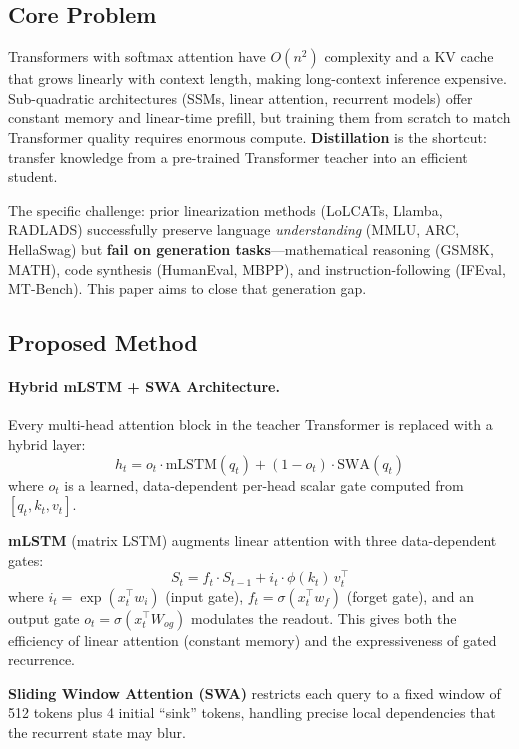 \documentclass[11pt]{article}
\begin{document}
\subsection{Core Problem}

Transformers with softmax attention have $O(n^2)$ complexity and a KV cache that grows linearly with context length, making long-context inference expensive.
Sub-quadratic architectures (SSMs, linear attention, recurrent models) offer constant memory and linear-time prefill, but training them from scratch to match Transformer quality requires enormous compute.
\textbf{Distillation} is the shortcut: transfer knowledge from a pre-trained Transformer teacher into an efficient student.

The specific challenge: prior linearization methods (LoLCATs, Llamba, RADLADS) successfully preserve language \emph{understanding} (MMLU, ARC, HellaSwag) but \textbf{fail on generation tasks}---mathematical reasoning (GSM8K, MATH), code synthesis (HumanEval, MBPP), and instruction-following (IFEval, MT-Bench).
This paper aims to close that generation gap.

\subsection{Proposed Method}

\paragraph{Hybrid mLSTM + SWA Architecture.}
Every multi-head attention block in the teacher Transformer is replaced with a hybrid layer:
\[
h_t = o_t \cdot \mathrm{mLSTM}(q_t) + (1 - o_t) \cdot \mathrm{SWA}(q_t)
\]
where $o_t$ is a learned, data-dependent per-head scalar gate computed from $[q_t, k_t, v_t]$.

\textbf{mLSTM} (matrix LSTM) augments linear attention with three data-dependent gates:
\[
S_t = f_t \cdot S_{t-1} + i_t \cdot \phi(k_t)\, v_t^\top
\]
where $i_t = \exp(x_t^\top w_i)$ (input gate), $f_t = \sigma(x_t^\top w_f)$ (forget gate), and an output gate $o_t = \sigma(x_t^\top W_{og})$ modulates the readout.
This gives both the efficiency of linear attention (constant memory) and the expressiveness of gated recurrence.

\textbf{Sliding Window Attention (SWA)} restricts each query to a fixed window of 512 tokens plus 4 initial ``sink'' tokens, handling precise local dependencies that the recurrent state may blur.
\end{document}

